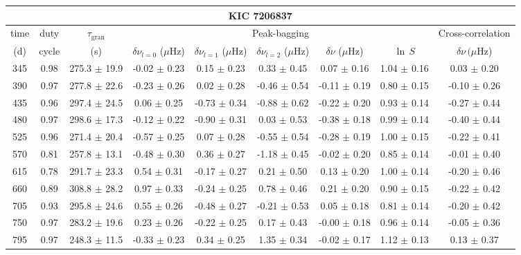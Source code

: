 \documentclass[twocolumn]{aastex61}%
\begin{document}
\begin{table*}[ht]\centering\fontsize{9.}{7.}\selectfont
\begin{tabular}{ccc|ccccc|c}
\multicolumn{9}{c}{KIC 7206837}\\ \hline\hline
time & duty & $\tau_\text{gran}$ &\multicolumn{5}{c|}{Peak-bagging}&Cross-correlation\\
(d)& cycle & (s)&$\delta\nu_{l=0}$ ($\mu$Hz) & $\delta\nu_{l=1}$ ($\mu$Hz) & $\delta\nu_{l=2}$ ($\mu$Hz) & $\delta\nu$ ($\mu$Hz)& $\ln\,S$ & $\delta\nu\,(\mu$Hz)\\\hline
345 & 0.98 & 275.3 $\pm$ 19.9 & -0.02 $\pm$ 0.23 & 0.15 $\pm$ 0.23 & 0.33 $\pm$ 0.45 & 0.07 $\pm$ 0.16 & 1.04 $\pm$ 0.16 & 0.03 $\pm$ 0.20\\
390 & 0.97 & 277.8 $\pm$ 22.6 & -0.23 $\pm$ 0.26 & 0.02 $\pm$ 0.28 & -0.46 $\pm$ 0.54 & -0.11 $\pm$ 0.19 & 0.80 $\pm$ 0.15 & -0.10 $\pm$ 0.26\\
435 & 0.96 & 297.4 $\pm$ 24.5 & 0.06 $\pm$ 0.25 & -0.73 $\pm$ 0.34 & -0.88 $\pm$ 0.62 & -0.22 $\pm$ 0.20 & 0.93 $\pm$ 0.14 & -0.27 $\pm$ 0.44\\
480 & 0.97 & 298.6 $\pm$ 17.3 & -0.12 $\pm$ 0.22 & -0.90 $\pm$ 0.31 & 0.03 $\pm$ 0.53 & -0.38 $\pm$ 0.18 & 0.99 $\pm$ 0.14 & -0.40 $\pm$ 0.44\\
525 & 0.96 & 271.4 $\pm$ 20.4 & -0.57 $\pm$ 0.25 & 0.07 $\pm$ 0.28 & -0.55 $\pm$ 0.54 & -0.28 $\pm$ 0.19 & 1.00 $\pm$ 0.15 & -0.22 $\pm$ 0.41\\
570 & 0.81 & 257.8 $\pm$ 13.1 & -0.48 $\pm$ 0.30 & 0.36 $\pm$ 0.27 & -1.18 $\pm$ 0.45 & -0.02 $\pm$ 0.20 & 0.85 $\pm$ 0.14 & -0.01 $\pm$ 0.40\\
615 & 0.78 & 291.7 $\pm$ 23.3 & 0.54 $\pm$ 0.31 & -0.17 $\pm$ 0.27 & 0.21 $\pm$ 0.50 & 0.13 $\pm$ 0.20 & 1.00 $\pm$ 0.14 & -0.20 $\pm$ 0.46\\
660 & 0.89 & 308.8 $\pm$ 28.2 & 0.97 $\pm$ 0.33 & -0.24 $\pm$ 0.25 & 0.78 $\pm$ 0.46 & 0.21 $\pm$ 0.20 & 0.90 $\pm$ 0.15 & -0.22 $\pm$ 0.42\\
705 & 0.93 & 295.8 $\pm$ 24.6 & 0.55 $\pm$ 0.26 & -0.48 $\pm$ 0.27 & -0.21 $\pm$ 0.53 & 0.05 $\pm$ 0.18 & 0.81 $\pm$ 0.14 & -0.20 $\pm$ 0.42\\
750 & 0.97 & 283.2 $\pm$ 19.6 & 0.23 $\pm$ 0.26 & -0.22 $\pm$ 0.25 & 0.17 $\pm$ 0.43 & -0.00 $\pm$ 0.18 & 0.96 $\pm$ 0.14 & -0.05 $\pm$ 0.36\\
795 & 0.97 & 248.3 $\pm$ 11.5 & -0.33 $\pm$ 0.23 & 0.34 $\pm$ 0.25 & 1.35 $\pm$ 0.34 & -0.02 $\pm$ 0.17 & 1.12 $\pm$ 0.13 & 0.13 $\pm$ 0.37\\

\end{tabular}
\end{table*}
\end{document}

